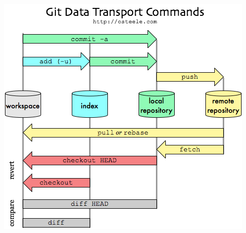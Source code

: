 \documentclass[a4paper,12pt,twoside]{book}
\begin{document}
\begin{itemize}
\includegraphics[scale=0.6]{pics/git-transport} \\

   \end{itemize}
\end{document}

